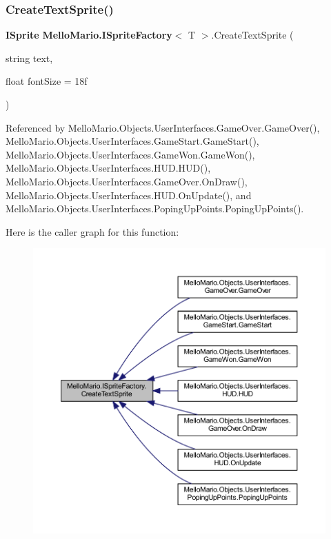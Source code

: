 \subsubsection{Create\+Text\+Sprite()}
{\footnotesize\ttfamily \textbf{ I\+Sprite} \textbf{ Mello\+Mario.\+I\+Sprite\+Factory}$<$ T $>$.Create\+Text\+Sprite (\begin{DoxyParamCaption}\item[{string}]{text,  }\item[{float}]{font\+Size = {\ttfamily 18f} }\end{DoxyParamCaption})}



Referenced by Mello\+Mario.\+Objects.\+User\+Interfaces.\+Game\+Over.\+Game\+Over(), Mello\+Mario.\+Objects.\+User\+Interfaces.\+Game\+Start.\+Game\+Start(), Mello\+Mario.\+Objects.\+User\+Interfaces.\+Game\+Won.\+Game\+Won(), Mello\+Mario.\+Objects.\+User\+Interfaces.\+H\+U\+D.\+H\+U\+D(), Mello\+Mario.\+Objects.\+User\+Interfaces.\+Game\+Over.\+On\+Draw(), Mello\+Mario.\+Objects.\+User\+Interfaces.\+H\+U\+D.\+On\+Update(), and Mello\+Mario.\+Objects.\+User\+Interfaces.\+Poping\+Up\+Points.\+Poping\+Up\+Points().

Here is the caller graph for this function\+:
\nopagebreak
\begin{figure}[H]
\begin{center}
\leavevmode
\includegraphics[width=350pt]{interfaceMelloMario_1_1ISpriteFactory_a240c908f42b48cd00a57ab07b52d8488_icgraph}
\end{center}
\end{figure}
\mbox{\label{interfaceMelloMario_1_1ISpriteFactory_a168b290e1eb2d13f064f01ad43ef0b56}} 
